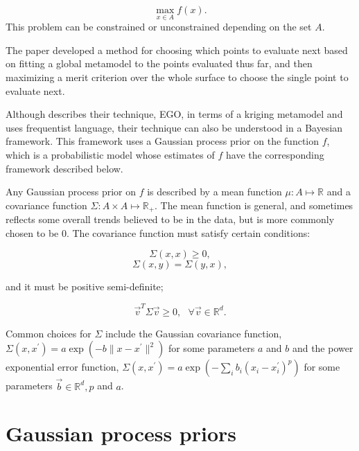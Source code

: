 \documentclass[phd,tocprelim]{cornell}
\begin{document}
\begin{equation}
\max_{x \in A} f(x).
\end{equation}
This problem can be constrained or unconstrained depending on the set $A$.

The paper \cite{Jones1998} developed a method for choosing which points to evaluate next based on fitting a global metamodel to the points evaluated thus far, and then maximizing a merit criterion over the whole surface to choose the single point to evaluate next.

Although \cite{Jones1998} describes their technique, EGO, in terms of a kriging metamodel and uses frequentist language, their technique can also be understood in a Bayesian framework. This framework uses a Gaussian process prior on the function $f$, which is a probabilistic model whose estimates of $f$ have the corresponding framework described below.

Any Gaussian process prior on $f$ is described by a mean function $\mu : A \mapsto \mathbb{R}$ and a covariance function $\Sigma : A \times A \mapsto \mathbb{R}_{+}$. The mean function is general, and sometimes reflects some overall trends believed to be in the data, but is more commonly chosen to be 0. The covariance function must satisfy certain conditions: 

\begin{equation}\Sigma(x,x) \geq 0,\end{equation}
\begin{equation}\Sigma(x,y) = \Sigma(y,x),\end{equation}

and it must be positive semi-definite;

\begin{equation}\vec{v}^{T}\Sigma \vec{v} \geq 0, \ \ \ \forall \vec{v} \in \mathbb{R}^{d}.\end{equation}

Common choices for $\Sigma$ include the Gaussian covariance function, $\Sigma(x,x^{\prime}) = a \exp(-b \| x - x^{\prime}\|^{2})$ for some parameters $a$ and $b$ and the power exponential error function, $\Sigma(x, x^{\prime}) = a \exp(-\sum_{i} b_{i} (x_{i} - x_{i}^{\prime})^{p})$ for some parameters $\vec{b} \in \mathbb{R}^{d}, p$ and $a$.

\section{Gaussian process priors}
\end{document}
